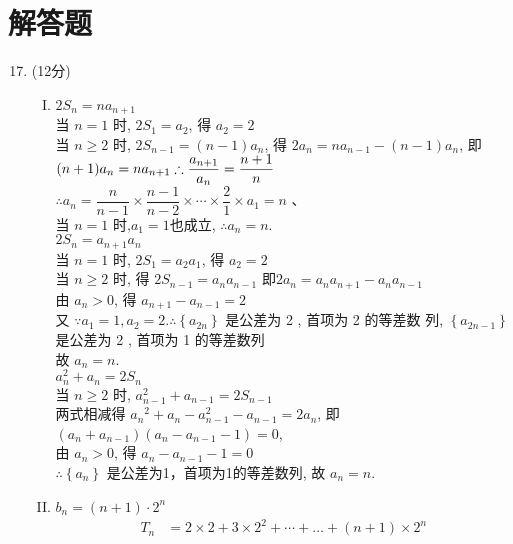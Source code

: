 \documentclass[11pt]{article}
\begin{document}
\section{\heiti 解答题}
\begin{enumerate}
	\setcounter{enumi}{16}
	\item (12分)
	\begin{enumerate}[(I)]
		\item 
		 $2 S_{n}=n a_{n+1}$ 
		\\当 $n=1$ 时, $2 S_{1}=a_{2}$, 得 $a_{2}=2$ 
		\\当 $n \geqslant 2$ 时, $2 S_{n-1}=(n-1) a_{n}$, 得 $2 a_{n}=n a_{n-1}-(n-1) a_{n}$, 即 $(n+1) a_{n}=n a_{n+1} 
		\\ \therefore \dfrac{a_{n+1}}{a_{n}}=\dfrac{n+1}{n}$ 
		\\$\therefore a_{n}=\dfrac{n}{n-1} \times \dfrac{n-1}{n-2} \times \cdots \times \dfrac{2}{1} \times a_{1}=n$ 、
		\\当 $n=1$ 时,$ a_1=1 $也成立, $\therefore a_{n}=n$.
		\\  $2 S_{n}=a_{n+1} a_{n}$ 
		\\当 $n=1$ 时, $2 S_{1}=a_{2} a_{1}$, 得 $a_{2}=2$ 
		\\当 $n \geqslant 2$ 时, 得 $2 S_{n-1}=a_na_{n-1}$
		即$2 a_{n}=a_{n} a_{n+1}-a_{n} a_{n-1}$ 
		\\由 $a_{n}>0$, 得 $a_{n+1}-a_{n-1}=2$ 
		\\又 $\because a_{1}=1, a_{2}=2 . \therefore\left\{a_{2 n}\right\}$ 是公差为 2 , 首项为 2 的等差数
		列, $\left\{a_{2 n-1}\right\}$ 是公差为 2 , 首项为 1 的等差数列 
		\\故 $a_{n}=n$. 
		\\ $a_{n}^{2}+a_{n}=2 S_{n}$ 
		\\当 $n \geqslant 2$ 时,
		$a_{n-1}^{2}+a_{n-1}=2 S_{n-1}$ 
		\\两式相减得 $a_{n}{ }^{2}+a_{n}-a_{n-1}^{2}-a_{n-1}=2 a_{n}$, 即 $\left(a_{n}+a_{n-1}\right)\left(a_{n}-a_{n-1}-1\right)=0$,
		\\由 $a_{n}>0$, 得 $a_{n}-a_{n-1}-1=0$ 
		\\ $\therefore\left\{a_{n}\right\}$ 是公差为1，首项为1的等差数列, 
		故 $a_{n}=n$.
		\item $b_{n}=(n+1) \cdot 2^{n}$
		\begin{align*}
		T_{n}&=2 \times 2+3 \times 2^{2}+\cdots+\ldots+(n+1) \times 2^{n}\\

\end{align*}
\end{enumerate}
\end{enumerate}
\end{document}
